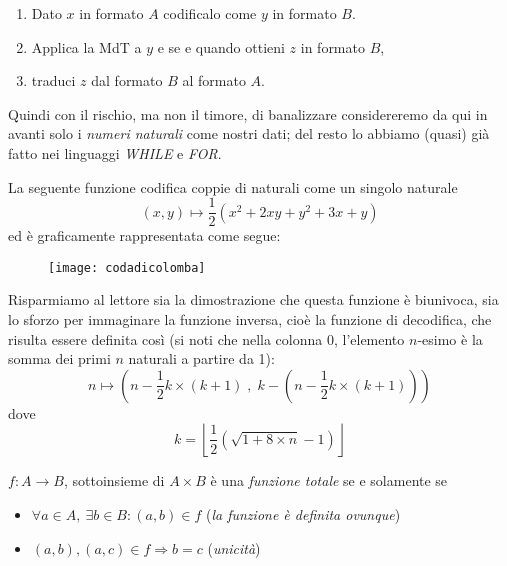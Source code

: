\begin{enumerate}
    \item Dato $x$ in formato $A$ codificalo come $y$ in formato $B$.
    \item Applica la MdT a $y$ e se e quando ottieni $z$ in formato $B$,
    \item traduci $z$ dal formato $B$ al formato $A$.
\end{enumerate}

\noindent Quindi con il rischio, ma non il timore, di banalizzare considereremo da qui in avanti solo i \textit{numeri naturali} come nostri dati; del resto lo abbiamo (quasi) già fatto nei linguaggi \textit{\footnotesize WHILE} e \textit{\footnotesize FOR}.

\begin{example}

    La seguente funzione codifica coppie di naturali come un singolo naturale
    \[(x,y) \mapsto \frac{1}{2}\left(x^2+2xy+y^2+3x+y\right)\]
    ed è graficamente rappresentata come segue:

    \begin{figure}[H]
        \centering
        \texttt{[image: codadicolomba]}
    \end{figure}

    \noindent Risparmiamo al lettore sia la dimostrazione che questa funzione è biunivoca, sia lo sforzo per immaginare la funzione inversa, cioè la funzione di decodifica, che risulta essere definita così (si noti che nella colonna 0, l'elemento $n$-esimo è la somma dei primi $n$ naturali a partire da 1):
    \[n\mapsto\left(n-\frac{1}{2}k\times(k+1)\; , \; k-\left(n-\frac{1}{2}k\times(k+1)\right)\right)\]
    dove \[k=\left\lfloor{\frac{1}{2}\left(\sqrt{1+8\times n}-1\right)}\right\rfloor\]

\end{example}

\begin{definition}
    $f:A\rightarrow B$, sottoinsieme di $A \times B$ è una \textit{funzione totale} se e solamente se
    \begin{itemize}
        \item $\forall a \in A,\ \exists b\in B : (a,b) \in f$ (\textit{la funzione è definita ovunque})
        \item $(a,b), (a,c) \in f \Rightarrow b=c$ (\textit{unicità})
    \end{itemize}
\end{definition}

